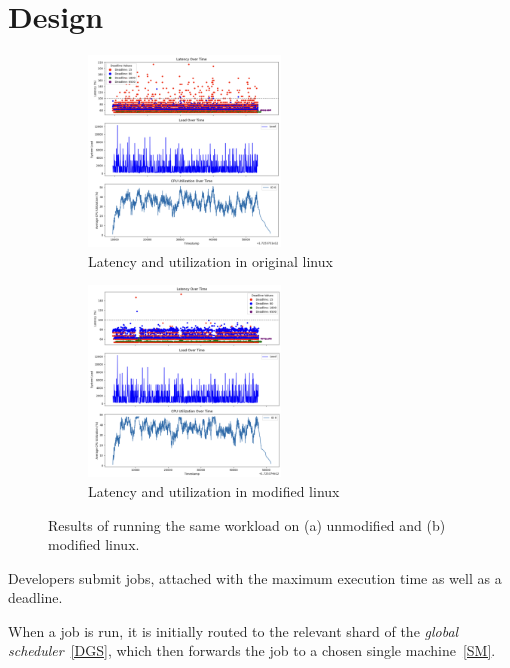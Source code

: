 \section{Design}

\begin{figure}[ht!]
    \centering
    \begin{subfigure}[t]{0.5\textwidth}
        \centering
        \includegraphics[height=2in]{img/old_lnx__2ms_wait__10K_iter.png}
        \caption{Latency and utilization in original linux}
    \end{subfigure}%
    \hfill
    \begin{subfigure}[t]{0.5\textwidth}
        \centering
        \includegraphics[height=2in]{img/new_lnx__2ms_wait__10K_iter.png}
        \caption{Latency and utilization in modified linux}
        \label{fig:graph:new}
    \end{subfigure}
    \vspace{10pt}
    \caption{Results of running the same workload on (a) unmodified and (b) modified linux.}
    \label{fig:graph}
\end{figure}

Developers submit jobs, attached with the maximum execution time as well as a
deadline. 

When a job is run, it is initially routed to the relevant shard of the
\textit{global scheduler}~\ref{DGS}, which then forwards the job to a chosen
single machine~\ref{SM}. 



